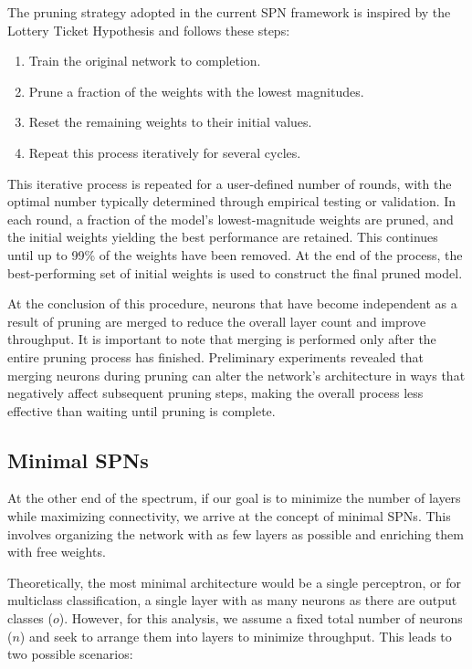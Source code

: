 The pruning strategy adopted in the current SPN framework is inspired by the Lottery Ticket Hypothesis and follows these steps:
\begin{enumerate}
    \item Train the original network to completion.
    \item Prune a fraction of the weights with the lowest magnitudes.
    \item Reset the remaining weights to their initial values.
    \item Repeat this process iteratively for several cycles.
\end{enumerate}

This iterative process is repeated for a user-defined number of rounds, with the optimal number typically determined through empirical testing or validation. In each round, a fraction of the model’s lowest-magnitude weights are pruned, and the initial weights yielding the best performance are retained. This continues until up to 99\% of the weights have been removed. At the end of the process, the best-performing set of initial weights is used to construct the final pruned model.

At the conclusion of this procedure, neurons that have become independent as a result of pruning are merged to reduce the overall layer count and improve throughput. It is important to note that merging is performed only after the entire pruning process has finished. Preliminary experiments revealed that merging neurons during pruning can alter the network's architecture in ways that negatively affect subsequent pruning steps, making the overall process less effective than waiting until pruning is complete.

\subsection{Minimal SPNs}

At the other end of the spectrum, if our goal is to minimize the number of layers while maximizing connectivity, we arrive at the concept of minimal SPNs. This involves organizing the network with as few layers as possible and enriching them with free weights.

Theoretically, the most minimal architecture would be a single perceptron, or for multiclass classification, a single layer with as many neurons as there are output classes ($o$). However, for this analysis, we assume a fixed total number of neurons ($n$) and seek to arrange them into layers to minimize throughput. This leads to two possible scenarios:

